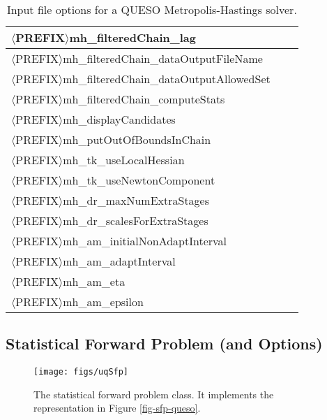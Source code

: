\begin{table}[!h]
\begin{center}
\begin{tabular}{|l|c|c|}
\hline
$\langle$PREFIX$\rangle$mh\_filteredChain\_lag                  &         &             \\
\hline
$\langle$PREFIX$\rangle$mh\_filteredChain\_dataOutputFileName   &         &             \\
\hline
$\langle$PREFIX$\rangle$mh\_filteredChain\_dataOutputAllowedSet &         &             \\
\hline
$\langle$PREFIX$\rangle$mh\_filteredChain\_computeStats         &         &             \\
\hline
$\langle$PREFIX$\rangle$mh\_displayCandidates                   &         &             \\
\hline
$\langle$PREFIX$\rangle$mh\_putOutOfBoundsInChain               &         &             \\
\hline
$\langle$PREFIX$\rangle$mh\_tk\_useLocalHessian                 &         &             \\
\hline
$\langle$PREFIX$\rangle$mh\_tk\_useNewtonComponent              &         &             \\
\hline
$\langle$PREFIX$\rangle$mh\_dr\_maxNumExtraStages               &         &             \\
\hline
$\langle$PREFIX$\rangle$mh\_dr\_scalesForExtraStages            &         &             \\
\hline
$\langle$PREFIX$\rangle$mh\_am\_initialNonAdaptInterval         &         &             \\
\hline
$\langle$PREFIX$\rangle$mh\_am\_adaptInterval                   &         &             \\
\hline
$\langle$PREFIX$\rangle$mh\_am\_eta                             &         &             \\
\hline
$\langle$PREFIX$\rangle$mh\_am\_epsilon                         &         &             \\
\hline
\end{tabular}
\end{center}
\caption{
Input file options for a QUESO Metropolis-Hastings solver.
}
\label{tab-metropolis-hastings-options}
\end{table}

\subsection{Statistical Forward Problem (and Options)}

\begin{figure}[h!]
\centerline{
\texttt{[image: figs/uqSfp]}
}
\caption{
The statistical forward problem class. It implements the representation in Figure \ref{fig-sfp-queso}.
}
\label{fig-sfp-class}
\end{figure}

